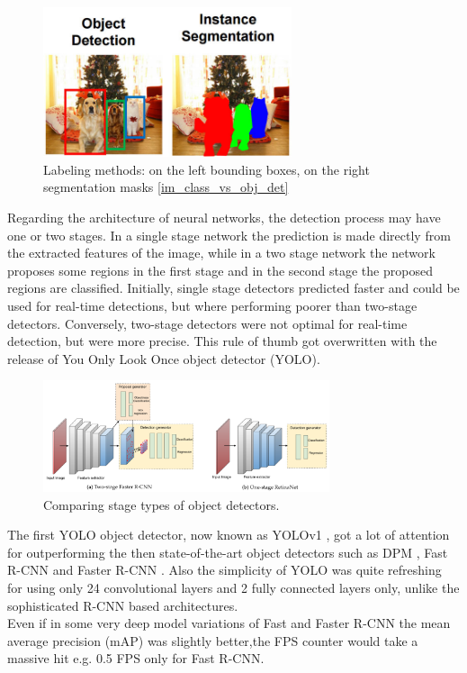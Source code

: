 \begin{figure}[!h]
\centering
\includegraphics[width=0.65\textwidth]{images/bbs_vs_seg}
\caption{Labeling methods: on the left bounding boxes, on the right segmentation masks \ref{im_class_vs_obj_det}}
\end{figure}

Regarding the architecture of neural networks, the detection process may have one or two stages. In a single stage network the prediction is made directly from the extracted features of the image, while in a two stage network the network proposes some regions in the first stage and in the second stage the proposed regions are classified. Initially, single stage detectors predicted faster and could be used for real-time detections, but where performing poorer than two-stage detectors. Conversely, two-stage detectors were not optimal for real-time detection, but were more precise. This rule of thumb got overwritten with the release of You Only Look Once object detector (YOLO).

\begin{figure}[!h]
\centering
\includegraphics[width=0.75\textwidth]{images/single_stage_vs_two_stage}
\caption{Comparing stage types of object detectors.}
\end{figure}



The first YOLO object detector, now known as YOLOv1 \cite{yolov1_paper}, got a lot of attention for outperforming the then state-of-the-art object detectors such as DPM \cite{dpm_paper}, Fast R-CNN \cite{fast_rcnn_paper} and Faster R-CNN \cite{faster_rcnn_paper}. Also the simplicity of YOLO was quite refreshing for using only 24 convolutional layers and 2 fully connected layers only, unlike the sophisticated R-CNN based architectures. \\
Even if in some very deep model variations of Fast and Faster R-CNN the mean average precision (mAP) was slightly better,the FPS counter would take a massive hit e.g. 0.5 FPS only for Fast R-CNN. \\



